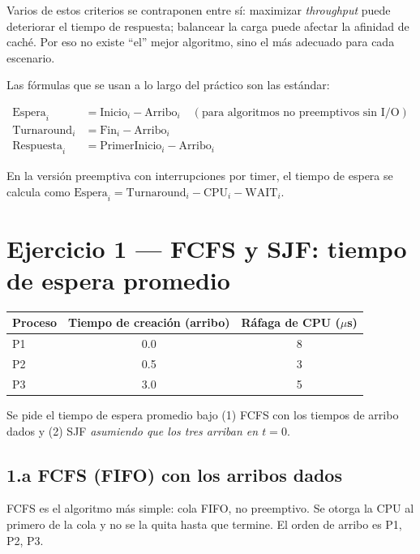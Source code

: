 \documentclass[11pt,a4paper]{article}
\begin{document}
Varios de estos criterios se contraponen entre sí: maximizar
\emph{throughput} puede deteriorar el tiempo de respuesta;
balancear la carga puede afectar la afinidad de caché. Por eso no
existe ``el'' mejor algoritmo, sino el más adecuado para cada
escenario.

Las fórmulas que se usan a lo largo del práctico son las estándar:

\begin{align*}
\text{Espera}_i      &= \text{Inicio}_i - \text{Arribo}_i
                       \quad (\text{para algoritmos no preemptivos sin I/O}) \\
\text{Turnaround}_i  &= \text{Fin}_i - \text{Arribo}_i \\
\text{Respuesta}_i   &= \text{PrimerInicio}_i - \text{Arribo}_i
\end{align*}

En la versión preemptiva con interrupciones por timer, el tiempo de
espera se calcula como
$\text{Espera}_i = \text{Turnaround}_i - \text{CPU}_i - \text{WAIT}_i$.

\section{Ejercicio 1 --- FCFS y SJF: tiempo de espera promedio}

\begin{center}
\small
\begin{tabular}{@{}lcc@{}}
\toprule
Proceso & Tiempo de creación (arribo) & Ráfaga de CPU (\(\mu\)s) \\
\midrule
P1 & 0.0 & 8 \\
P2 & 0.5 & 3 \\
P3 & 3.0 & 5 \\
\bottomrule
\end{tabular}
\end{center}

Se pide el tiempo de espera promedio bajo (1) FCFS con los tiempos de
arribo dados y (2) SJF \emph{asumiendo que los tres arriban en
$t = 0$}.

\subsection{1.a FCFS (FIFO) con los arribos dados}

FCFS es el algoritmo más simple: cola FIFO, no preemptivo. Se otorga
la CPU al primero de la cola y no se la quita hasta que termine. El
orden de arribo es P1, P2, P3.
\end{document}
